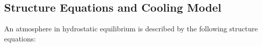 \documentclass[apj]{emulateapj}
\begin{document}
%
%
%





%

\subsection{Structure Equations and Cooling Model}
\label{struct}

An atmosphere in hydrostatic equilibrium is described by the following structure equations:
\end{document}
